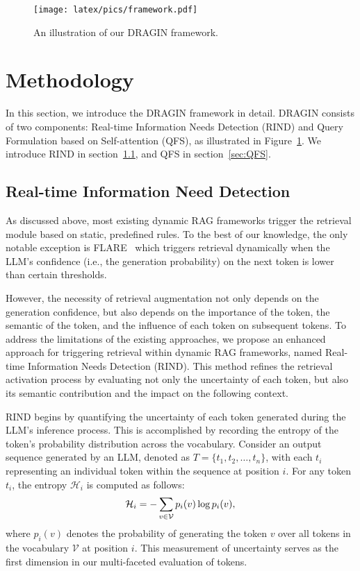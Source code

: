 \begin{figure}[t]
\centering
    \texttt{[image: latex/pics/framework.pdf]}
    \small{\caption{An illustration of our DRAGIN framework.} \label{pic:framework}}
\end{figure}

\section{Methodology}
In this section, we introduce the DRAGIN framework in detail. DRAGIN consists of two components: Real-time Information Needs Detection (RIND) and Query Formulation based on Self-attention (QFS), as illustrated in Figure~\ref{pic:framework}. We introduce RIND in section~\ref{sec:RIND}, and QFS in section~\ref{sec:QFS}.

\subsection{Real-time Information Need Detection}
\label{sec:RIND}

As discussed above, most existing dynamic RAG frameworks trigger the retrieval module based on static, predefined rules. 
To the best of our knowledge, the only notable exception is FLARE~\cite{jiang2023active} which triggers retrieval dynamically when the LLM's confidence (i.e., the generation probability) on the next token is lower than certain thresholds. 

However, the necessity of retrieval augmentation not only depends on the generation confidence, but also depends on the importance of the token, the semantic  of the token, and the influence of each token on subsequent tokens.
To address the limitations of the existing approaches, we propose an enhanced approach for triggering retrieval within dynamic RAG frameworks, named Real-time Information Needs Detection (RIND). 
This method refines the retrieval activation process by evaluating not only the uncertainty of each token, but also its semantic contribution and the impact on the following context.

RIND begins by quantifying the uncertainty of each token generated during the LLM's inference process. This is accomplished by recording the entropy of the token's probability distribution across the vocabulary. 
Consider an output sequence generated by an LLM, denoted as \( T = \{t_1, t_2, \ldots, t_n\} \), with each \( t_i \) representing an individual token within the sequence at position $i$.
For any token \(t_i\), the entropy \(\mathcal{H}_i\) is computed as follows:
\begin{equation}
\small
    \mathcal{H}_i = -\sum_{{v} \in \mathcal{V}} p_i({v}) \log p_i({v}),
\end{equation}
where $p_i(v)$ denotes the probability of generating the token $v$ over all tokens in the vocabulary $\mathcal{V}$ at position $i$.
This measurement of uncertainty serves as the first dimension in our multi-faceted evaluation of tokens.


